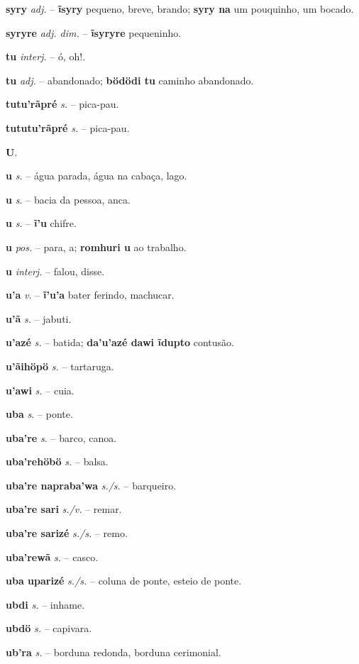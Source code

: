 \textbf{syry} \textit{adj.} -- \textbf{ĩsyry} pequeno, breve, brando; \textbf{syry na} um pouquinho, um bocado.

\textbf{syryre} \textit{adj. dim.} -- \textbf{ĩsyryre} pequeninho.

\textbf{tu} \textit{interj.} -- ó, oh!.

\textbf{tu} \textit{adj.} -- abandonado; \textbf{bödödi tu} caminho abandonado.

\textbf{tutu'rãpré} \textit{s.} -- pica-pau.

\textbf{tututu'rãpré} \textit{s.} -- pica-pau.



\textbf{U}.



\textbf{u} \textit{s.} -- água parada, água na cabaça, lago.

\textbf{u} \textit{s.} -- bacia da pessoa, anca.

\textbf{u} \textit{s.} -- \textbf{ĩ'u} chifre.

\textbf{u} \textit{pos.} -- para, a; \textbf{romhuri u} ao trabalho.

\textbf{u} \textit{interj.} -- falou, disse.

\textbf{u'a} \textit{v.} -- \textbf{ĩ'u'a} bater ferindo, machucar.

\textbf{u'ã} \textit{s.} -- jabuti.

\textbf{u'azé} \textit{s.} -- batida; \textbf{da'u'azé dawi ĩdupto} contusão.

\textbf{u'ãihöpö} \textit{s.} -- tartaruga.

\textbf{u'awi} \textit{s.} -- cuia.

\textbf{uba} \textit{s.} -- ponte.

\textbf{uba're} \textit{s.} -- barco, canoa.

\textbf{uba'rehöbö} \textit{s.} -- balsa.

\textbf{uba're napraba'wa} \textit{s./s.} -- barqueiro.

\textbf{uba're sari} \textit{s./v.} -- remar.

\textbf{uba're sarizé} \textit{s./s.} -- remo.

\textbf{uba'rewã} \textit{s.} -- casco.

\textbf{uba uparizé} \textit{s./s.} -- coluna de ponte, esteio de ponte.

\textbf{ubdi} \textit{s.} -- inhame.

\textbf{ubdö} \textit{s.} -- capivara.

\textbf{ub'ra} \textit{s.} -- borduna redonda, borduna cerimonial.

